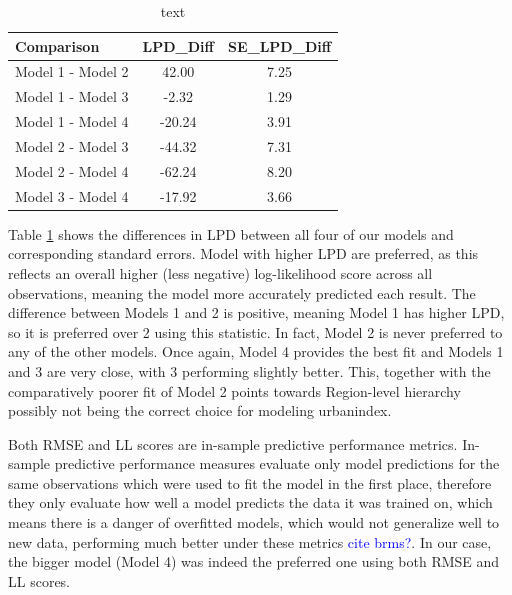\documentclass[12pt]{article}
\newcommand{\red}[1]{\textcolor{red}{#1}}
\newcommand{\blue}[1]{\textcolor{blue}{#1}}
\begin{document}



\begin{table}[ht]
	\centering
	\begin{tabular}{lcc}
		\hline
		       Comparison & LPD\_Diff & SE\_LPD\_Diff \\ 
		       \midrule
		Model 1 - Model 2 &     42.00 &          7.25 \\
		Model 1 - Model 3 &     -2.32 &          1.29 \\
		Model 1 - Model 4 &    -20.24 &          3.91 \\
		Model 2 - Model 3 &    -44.32 &          7.31 \\
		Model 2 - Model 4 &    -62.24 &          8.20 \\
		Model 3 - Model 4 &    -17.92 &          3.66 \\ \hline
	\end{tabular}
	\caption{text}
	\label{tab:LPD_diff}
\end{table}

Table \ref{tab:LPD_diff} shows the differences in LPD between all four of our models and corresponding standard errors.
Model with higher LPD are preferred, as this reflects an overall higher (less negative) log-likelihood score across all observations, meaning the model more accurately predicted each result.
The difference between Models 1 and 2 is positive, meaning Model 1 has higher LPD, so it is preferred over 2 using this statistic. In fact, Model 2 is never preferred to any of the other models. Once again, Model 4 provides the best fit and Models 1 and 3 are very close, with 3 performing slightly better. This, together with the comparatively poorer fit of Model 2 points towards Region-level hierarchy possibly not being the correct choice for modeling urbanindex.



Both RMSE and LL scores are in-sample predictive performance metrics. In-sample predictive performance measures evaluate only model predictions for the same observations which were used to fit the model in the first place, therefore they only evaluate how well a model predicts the data it was trained on, which means there is a danger of overfitted models, which would not generalize well to new data, performing much better under these metrics \blue{cite brms?}.
In our case, the bigger model (Model 4) was indeed the preferred one using both RMSE and LL scores.
\end{document}
